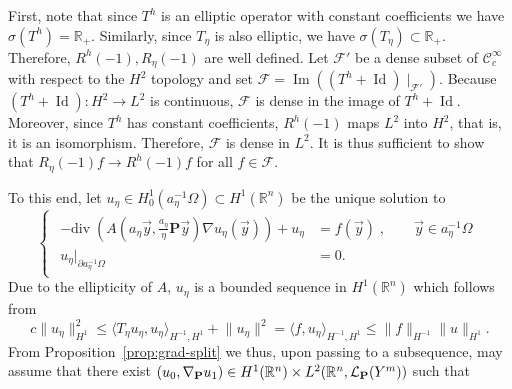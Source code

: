 \documentclass[a4paper,reqno]{amsart}
\numberwithin{equation}{section}
\numberwithin{equation}{section}		%
\numberwithin{figure}{section}			%
\numberwithin{table}{section}				%
\newcommand{\R}{\mathbb{R}}
\theoremstyle{definition}
\newcommand{\<}{\ensuremath \leq}
\renewcommand{\>}{\ensuremath \geq}
\begin{document}
First, note that since $T^h$ is an elliptic operator with constant coefficients we have $\sigma (T^h) = \mathbb{R}_+$. Similarly, since $T_\eta$ is also elliptic, we have $\sigma(T_\eta) \subset \R_+$. Therefore, $R^h(-1), R_\eta(-1)$ are well defined. Let $\mathcal{F'}$ be a dense subset of $\mathcal{C}^\infty_c$ with respect to the $H^2$ topology and set $\mathcal{F} = \operatorname{Im}((T^h+\operatorname{Id})\mid_{\mathcal{F}'})$. Because $(T^h+\operatorname{Id}):H^2\rightarrow L^2$ is continuous, $\mathcal{F}$ is dense in the image of $T^h+\operatorname{Id}$. Moreover, since $T^h$ has constant coefficients, $R^h(-1)$ maps $L^2$ into $H^{2}$, that is, it is an isomorphism. Therefore, $\mathcal{F}$ is dense in $L^2$. It is thus sufficient to show that $R_{\eta}(-1)f\rightarrow R^h(-1)f$ for all $f \in \mathcal{F}$.

To this end, let $u_\eta \in H^1_0(a_\eta^{-1}\Omega)\subset H^1(\R^n)$ be the unique solution to 
\begin{equation}\label{eq:Supercritical1}
    \begin{cases}
        \begin{aligned}
          - \mathrm{div} \; \left( A\left( a_\eta \vec{y}, \frac{a_\eta}{\eta}\textbf{P} \vec{y} \right) \nabla u_\eta({\vec y}) \right ) + u_\eta& = f(\vec y) \;, \qquad \vec{y} \in a_\eta^{-1}\Omega\\
            u_\eta|_{\partial a_\eta^{-1}\Omega} & = 0.
        \end{aligned}
    \end{cases}
\end{equation}
Due to the ellipticity of $A$, $u_\eta$ is a bounded sequence in $H^1(\R^n)$ which follows from
\begin{equation*}
    c\lVert u_\eta\rVert_{H^1}^2\leq\langle T_\eta u_\eta,u_\eta\rangle_{H^{-1},H^1} + \lVert u_\eta \rVert^2 = \langle f, u_\eta\rangle_{H^{-1},H^1} \leq \lVert f\rVert_{H^{-1}}\lVert u\rVert_{H^1}.
\end{equation*} From Proposition~\ref{prop:grad-split} we thus, upon passing to a subsequence, may assume that there exist $(u_0,\nabla_{\bf P}u_1) \in H^1(\R^n) \times L^2(\R^n, \mathcal{L}_{\textbf{P}}(Y^m))$ such that
\end{document}
